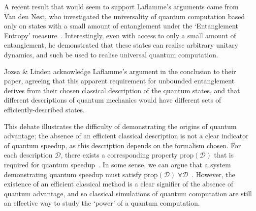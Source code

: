 \documentclass{standalone}
\begin{document}
\par
A recent result that would seem to support Laflamme's arguments came from Van den Nest, who investigated the universality of quantum computation based only on states with a small amount of entanglement under the `Entanglement Entropy' measure~\cite{VanDenNest2013}. Interestingly, even with access to only a small amount of entanglement, he demonstrated that these states can realise arbitrary unitary dynamics, and such be used to realise universal quantum computation. 
\par
Jozsa \& Linden acknowledge Laflamme's argument in the conclusion to their paper, agreeing that this apparent requirement for unbounded entanglement derives from their chosen classical description of the quantum states, and that different descriptions of quantum mechanics would have different sets of efficiently-described states. 
\par
This debate illustrates the difficulty of demonstrating the origins of quantum advantage; the absence of an efficient classical description is not a clear indicator of quantum speedup, as this description depends on the formalism chosen. For each description $\mathcal{D}$, there exists a corresponding property $\text{prop}(\mathcal{D})$ that is required for quantum speedup~\cite{Jozsa2003}. In some sense, we can argue that a system demonstrating quantum speedup must satisfy $\text{prop}(\mathcal{D})\;\forall\mathcal{D}$~\cite{Jozsa2003,Laflamme2001}. However, the existence of an efficient classical method is a clear signifier of the absence of quantum advantage, and so classical simulations of quantum computation are still an effective way to study the `power' of a quantum computation.
\par
\end{document}

